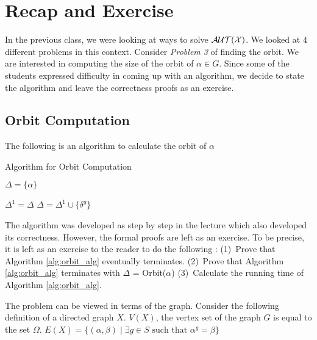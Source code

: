 
\section{Recap and Exercise}
In the previous class, we were looking at ways to solve $\cal{AUT}(X)$.  We looked at $4$ different problems in this context. Consider \emph{Problem 3} of finding the orbit. We are interested in computing the size of the orbit of  $\alpha \in G$. Since some of the students expressed difficulty in coming up with an algorithm, we decide to state the algorithm and leave the correctness proofs as an exercise.

\subsection{Orbit Computation} \label{sec:orbit-comp}
The following is an algorithm to calculate the orbit of $\alpha$

\begin{algorithm}[htp!]
\caption{Algorithm for Orbit Computation}\label{orbit}
\label{alg:orbit_alg}
\begin{algorithmic}[1]
\State $\Delta = \lbrace \alpha \rbrace$

\Repeat{}
\State $\Delta^1 = \Delta$
\State $\Delta = \Delta^1 \cup \lbrace \delta^g \rbrace$
\EndFor
\Until {$\Delta^1 \neq \Delta$}
\EndProcedure
\end{algorithmic}
\end{algorithm}

The algorithm was developed as step by step in the lecture which also developed its correctness. However, the formal proofs are left as an exercise. To be precise, it is left as an exercise to the reader to do the following : (1)~Prove that Algorithm \ref{alg:orbit_alg} eventually terminates. (2)~Prove that Algorithm \ref{alg:orbit_alg} terminates with $\Delta$ = Orbit($\alpha$)
(3)~Calculate the running time of Algorithm \ref{alg:orbit_alg}.

The problem can be viewed in terms of the graph. Consider the following definition of a directed graph $X$. $V(X)$, the vertex set of the graph $G$ is equal to the set $\Omega$. 
$E(X) = \lbrace (\alpha, \beta) \mid \exists g \in S \text{ such that } \alpha^g = \beta \rbrace $

